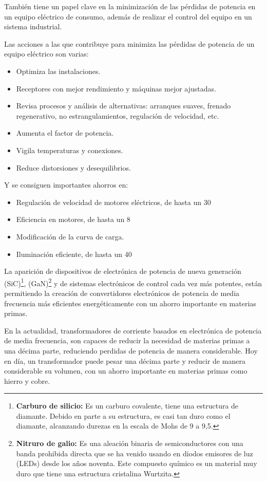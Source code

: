 \documentclass[12pt,letterpaper,superscriptaddress]{article}
\begin{document}
También tiene un papel clave en la minimización de las pérdidas de potencia en un equipo eléctrico de consumo, además de realizar el control del equipo en un sistema industrial.

Las acciones a las que contribuye para minimiza las pérdidas de potencia de un equipo eléctrico son varias:

\begin{itemize}
	\item Optimiza las instalaciones.
	\item Receptores con mejor rendimiento y máquinas mejor ajustadas.
	\item Revisa procesos y análisis de alternativas: arranques suaves, frenado regenerativo, no estrangulamientos, regulación de velocidad, etc.
	\item Aumenta el factor de potencia.
	\item Vigila temperaturas y conexiones.
	\item Reduce distorsiones y desequilibrios.
\end{itemize}


Y se consiguen importantes ahorros en:

\begin{itemize}
	\item Regulación de velocidad de motores eléctricos, de hasta un 30%
	\item Eficiencia en motores, de hasta un 8%
	\item Modificación de la curva de carga.
	\item Iluminación eficiente, de hasta un 40%
\end{itemize}

La aparición de dispositivos de electrónica de potencia de nueva generación (SiC)\footnote{\textbf{Carburo de silicio:} Es un carburo covalente, tiene una estructura de diamante. Debido en parte a su estructura, es casi tan duro como el diamante, alcanzando durezas en la escala de Mohs de 9 a 9,5.}, (GaN)\footnote{\textbf{Nitruro de galio:} Es una aleación binaria de semiconductores con una banda prohibida directa que se ha venido usando en diodos emisores de luz (LEDs) desde los años noventa. Este compuesto químico es un material muy duro que tiene una estructura cristalina Wurtzita.} y de sistemas electrónicos de control cada vez más potentes, están permitiendo la creación de convertidores electrónicos de potencia de media frecuencia más eficientes energéticamente con un ahorro importante en materias primas.

En la actualidad, transformadores de corriente basados en electrónica de potencia de media frecuencia, son capaces de reducir la necesidad de materias primas a una décima parte, reduciendo perdidas de potencia de manera considerable. Hoy en día, un transformador puede pesar una décima parte y reducir de manera considerable su volumen, con un ahorro importante en materias primas como hierro y cobre.
\end{document}
